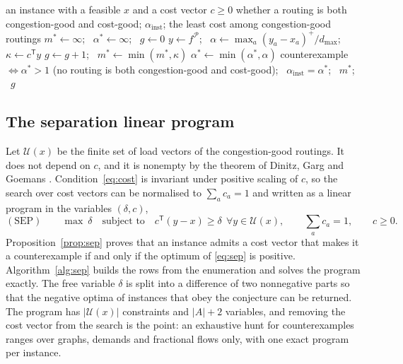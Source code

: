 \documentclass[11pt]{article}
\theoremstyle{remark}
\newcommand{\dmax}{d_{\max}}
\newcommand{\flow}{f}
\begin{document}
\begin{algorithm}[t]
\caption{Decision of an instance with given costs: enumeration of all routings, the two goodness conditions and the forced violation.}
\label{alg:decide}
\begin{algorithmic}[1]
\Require an instance with a feasible $x$ and a cost vector $c\ge0$
\Ensure whether a routing is both congestion-good and cost-good; $\alpha_{\mathrm{inst}}$; the least cost among congestion-good routings
\State $m^\ast\gets\infty$; \ $\alpha^\ast\gets\infty$; \ $g\gets0$
  \State $y\gets\flow^{\mathcal P}$; \ $\alpha\gets\max_a(y_a-x_a)^+/\dmax$; \ $\kappa\gets c^{\mathsf T}y$
   \State $g\gets g+1$; \ $m^\ast\gets\min(m^\ast,\kappa)$ \EndIf
   \State $\alpha^\ast\gets\min(\alpha^\ast,\alpha)$ \EndIf
\EndFor
\State \Return counterexample $\iff\alpha^\ast>1$ (no routing is both congestion-good and cost-good); \ $\alpha_{\mathrm{inst}}=\alpha^\ast$; \ $m^\ast$; \ $g$
\end{algorithmic}
\end{algorithm}

\subsection{The separation linear program}
\label{sec:sep}

Let $\mathcal U(x)$ be the finite set of load vectors of the congestion-good routings. It does not depend on $c$, and it is nonempty
by the theorem of Dinitz, Garg and Goemans \cite{DGG99}. Condition~\eqref{eq:cost} is invariant under positive scaling of $c$, so the
search over cost vectors can be normalised to $\sum_ac_a=1$ and written as a linear program in the variables $(\delta,c)$,
\begin{equation}
(\mathrm{SEP})\qquad \max\ \delta\quad\text{subject to}\quad c^{\mathsf T}(y-x)\ge\delta\ \ \forall y\in\mathcal U(x),\qquad
\textstyle\sum_ac_a=1,\qquad c\ge0 .
\label{eq:sep}
\end{equation}
Proposition~\ref{prop:sep} proves that an instance admits a cost vector that makes it a counterexample if and only if the optimum of
\eqref{eq:sep} is positive. Algorithm~\ref{alg:sep} builds the rows from the enumeration and solves the program exactly. The free variable $\delta$
is split into a difference of two nonnegative parts so that the negative optima of instances that obey the conjecture can be returned.
The program has $|\mathcal U(x)|$ constraints and $|A|+2$ variables, and removing the cost vector from the search is the point: an
exhaustive hunt for counterexamples ranges over graphs, demands and fractional flows only, with one exact program per instance.
\end{document}
